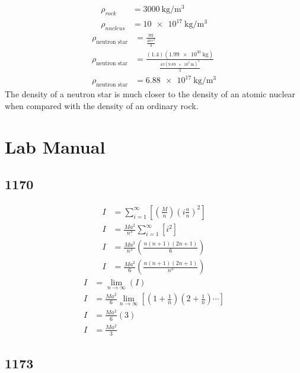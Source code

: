 \documentclass{article}
\begin{document}
\begin{enumerate}[label = \boldalpha]
\begin{align*}
			\rho_{rock} & = \SI{3000}{\kilogram \per \meter \cubed} \\
			\rho_{nucleus} & = \SI{10e17}{\kilogram \per \meter \cubed}
		\end{align*}
		\begin{align*}
			\rho_{\text{neutron star}} & = \frac{ m }{ \frac{ 4\pi r^3 }{ 3 } } \\
			\rho_{\text{neutron star}} & = \frac{ (1.4)(\SI{1.99e30}{\kilogram}) }{ \frac{ 4\pi (\SI{9.89e3}{\meter})^3 }{ 3 } } \\
			\rho_{\text{neutron star}} & = \SI{6.88e17}{\kilogram \per \meter \cubed}
		\end{align*}
		The density of a neutron star is much closer to the density of an atomic nuclear when compared with the density of an ordinary rock.
\end{enumerate}

\section{Lab Manual}

\subsection{1170}

\begin{align*}
	I & = \sum_{i = 1}^{\infty} \left[ \left( \frac{ M }{ n } \right) \left( i \frac{ a }{ n } \right)^2 \right] \\
	I & = \frac{ Ma^2 }{ n^3 } \sum_{i = 1}^{\infty} \left[ i^2 \right] \\
	I & = \frac{ Ma^2 }{ n^3 } \left( \frac{ n(n + 1)(2n + 1) }{ 6 } \right) \\
	I & = \frac{ Ma^2 }{ 6 } \left( \frac{ n(n + 1)(2n + 1) }{ n^3 } \right)
\end{align*}
\begin{align*}
	I & = \lim_{n \to \infty} \left( I \right) \\
	I & = \frac{ Ma^2 }{ 6 } \lim_{n \to \infty} \left[ \left( 1 + \frac{1}{n} \right) \left( 2 + \frac{1}{n} \right) \cdots \right] \\
	I & = \frac{ Ma^2 }{ 6 } (3) \\
	I & = \frac{ Ma^2 }{ 3 }
\end{align*}

\subsection{1173}
\end{document}
